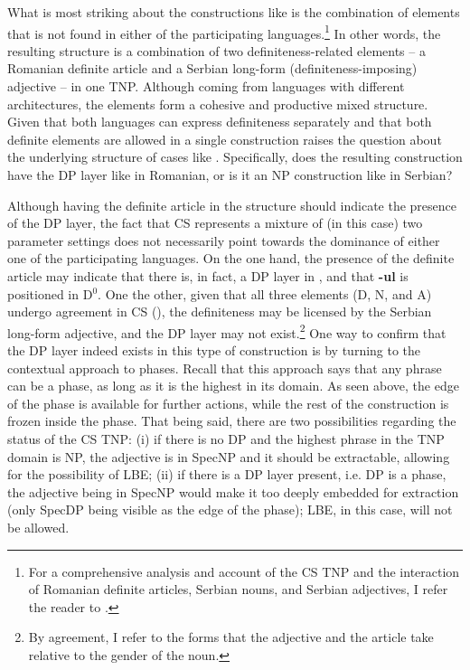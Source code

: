 \documentclass[output=paper,
hidelinks,
newtxmath,
]{langscibook}
\begin{document}
\noindent What is most striking about the constructions like  is the combination of elements that is not found in either of the participating languages.\footnote{\label{fn7}For a comprehensive analysis and account of the CS TNP and the interaction of Romanian definite articles, Serbian nouns, and Serbian adjectives, I refer the reader to \citet{Petroj}.} In other words, the resulting structure is a combination of two definiteness-related elements -- a Romanian definite article and a Serbian long-form (definiteness-imposing) adjective -- in one TNP. Although coming from languages with different architectures, the elements form a cohesive and productive mixed structure. Given that both languages can express definiteness separately and that both definite elements are allowed in a single construction raises the question about the underlying structure of cases like . Specifically, does the resulting construction have the DP layer like in Romanian, or is it an NP construction like in Serbian?

Although having the definite article in the structure should indicate the presence of the DP layer, the fact that CS represents a mixture of (in this case) two parameter settings does not necessarily point towards the dominance of either one of the participating languages. On the one hand, the presence of the definite article may indicate that there is, in fact, a DP layer in , and that \textbf{-ul} is positioned in D$^0$. One the other, given that all three elements (D, N, and A) undergo agreement in CS (\citealt{Petroj}), the definiteness may be licensed by the Serbian long-form adjective, and the DP layer may not exist.\footnote{\label{fn8}By agreement, I refer to the forms that the adjective and the article take relative to the gender of the noun.} One way to confirm that the DP layer indeed exists in this type of construction is by turning to the contextual approach to phases. Recall that this approach says that any phrase can be a phase, as long as it is the highest in its domain. As seen above, the edge of the phase is available for further actions, while the rest of the construction is frozen inside the phase. That being said, there are two possibilities regarding the status of the CS TNP: (i) if there is no DP and the highest phrase in the TNP domain is NP, the adjective is in SpecNP and it should be extractable, allowing for the possibility of LBE; (ii) if there is a DP layer present, i.e. DP is a phase, the adjective being in SpecNP would make it too deeply embedded for extraction (only SpecDP being visible as the edge of the phase); LBE, in this case, will not be allowed.
\end{document}
